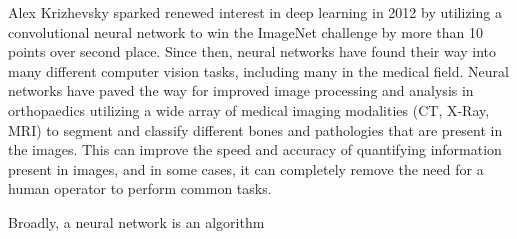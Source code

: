 \cite{krizhevskyImageNetClassificationDeep2017} Alex Krizhevsky sparked renewed interest in deep learning in 2012 by utilizing a convolutional neural network to win the ImageNet challenge \cite{russakovskyImageNetLargeScale2015} by more than 10 points over second place. Since then, neural networks have found their way into many different computer vision tasks, including many in the medical field. Neural networks have paved the way for improved image processing and analysis in orthopaedics utilizing a wide array of medical imaging modalities (CT, X-Ray, MRI) to segment and classify different bones and pathologies that are present in the images. This can improve the speed and accuracy of quantifying information present in images, and in some cases, it can completely remove the need for a human operator to perform common tasks.

Broadly, a neural network is an algorithm 



